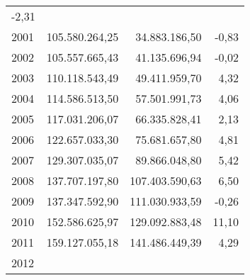 \begin{tabular}{llll}
  \multicolumn{1}{r}{-2,31} \\
\multicolumn{1}{l}{\hspace{1em}2001} &
  \multicolumn{1}{|r}{105.580.264,25} &
  \multicolumn{1}{r}{34.883.186,50} &
  \multicolumn{1}{r}{-0,83} \\
\multicolumn{1}{l}{\hspace{1em}2002} &
  \multicolumn{1}{|r}{105.557.665,43} &
  \multicolumn{1}{r}{41.135.696,94} &
  \multicolumn{1}{r}{-0,02} \\
\multicolumn{1}{l}{\hspace{1em}2003} &
  \multicolumn{1}{|r}{110.118.543,49} &
  \multicolumn{1}{r}{49.411.959,70} &
  \multicolumn{1}{r}{4,32} \\
\multicolumn{1}{l}{\hspace{1em}2004} &
  \multicolumn{1}{|r}{114.586.513,50} &
  \multicolumn{1}{r}{57.501.991,73} &
  \multicolumn{1}{r}{4,06} \\
\multicolumn{1}{l}{\hspace{1em}2005} &
  \multicolumn{1}{|r}{117.031.206,07} &
  \multicolumn{1}{r}{66.335.828,41} &
  \multicolumn{1}{r}{2,13} \\
\multicolumn{1}{l}{\hspace{1em}2006} &
  \multicolumn{1}{|r}{122.657.033,30} &
  \multicolumn{1}{r}{75.681.657,80} &
  \multicolumn{1}{r}{4,81} \\
\multicolumn{1}{l}{\hspace{1em}2007} &
  \multicolumn{1}{|r}{129.307.035,07} &
  \multicolumn{1}{r}{89.866.048,80} &
  \multicolumn{1}{r}{5,42} \\
\multicolumn{1}{l}{\hspace{1em}2008} &
  \multicolumn{1}{|r}{137.707.197,80} &
  \multicolumn{1}{r}{107.403.590,63} &
  \multicolumn{1}{r}{6,50} \\
\multicolumn{1}{l}{\hspace{1em}2009} &
  \multicolumn{1}{|r}{137.347.592,90} &
  \multicolumn{1}{r}{111.030.933,59} &
  \multicolumn{1}{r}{-0,26} \\
\multicolumn{1}{l}{\hspace{1em}2010} &
  \multicolumn{1}{|r}{152.586.625,97} &
  \multicolumn{1}{r}{129.092.883,48} &
  \multicolumn{1}{r}{11,10} \\
\multicolumn{1}{l}{\hspace{1em}2011} &
  \multicolumn{1}{|r}{159.127.055,18} &
  \multicolumn{1}{r}{141.486.449,39} &
  \multicolumn{1}{r}{4,29} \\
\multicolumn{1}{l}{\hspace{1em}2012} &

\end{tabular}
